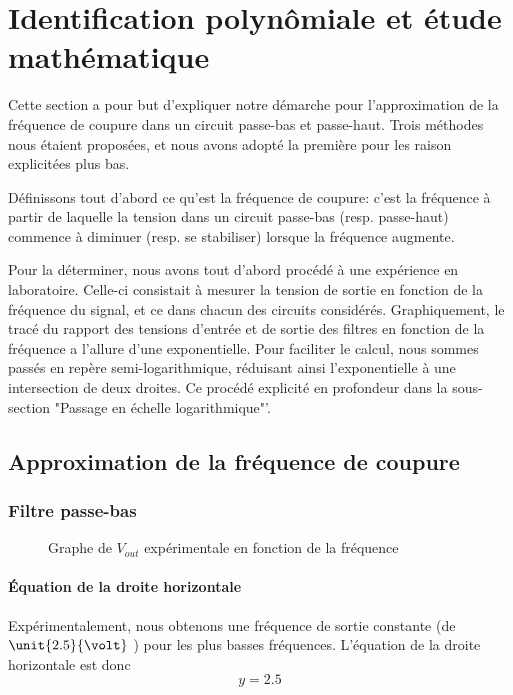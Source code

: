 
\section{Identification polynômiale et étude mathématique}

Cette section a pour but d'expliquer notre démarche pour l'approximation de la fréquence de coupure
dans un circuit passe-bas et passe-haut. Trois méthodes nous étaient proposées, et nous avons adopté 
la première pour les raison explicitées plus bas.

Définissons tout d'abord ce qu'est la fréquence de coupure: c'est la fréquence à partir de laquelle 
la tension dans un circuit passe-bas (resp. passe-haut) commence à diminuer (resp. se stabiliser) 
lorsque la fréquence augmente.

Pour la déterminer, nous avons tout d'abord procédé à une expérience en laboratoire.
Celle-ci consistait à mesurer la tension de sortie en fonction de la fréquence du signal, et ce dans 
chacun des circuits considérés.
Graphiquement, le tracé du rapport des tensions d'entrée et de sortie des filtres en fonction de la 
fréquence a l'allure d'une exponentielle.  Pour faciliter le calcul, nous sommes passés en repère 
semi-logarithmique, réduisant ainsi l'exponentielle à une intersection de deux droites. Ce procédé
explicité en profondeur dans la sous-section "Passage en échelle logarithmique"'.

\subsection{Approximation de la fréquence de coupure}

\subsubsection{Filtre passe-bas}

\begin{figure}[ht!]
\centering
{}
\caption{Graphe de $V_{out}$ expérimentale en fonction de la fréquence}
\label{lwp_ratio}
\end{figure}



\paragraph{Équation de la droite horizontale}
Expérimentalement, nous obtenons une fréquence de sortie constante (de $\unit{2.5}{\volt}$ ) 
pour les plus basses fréquences. L'équation de la droite horizontale est donc \[y=2.5\]

